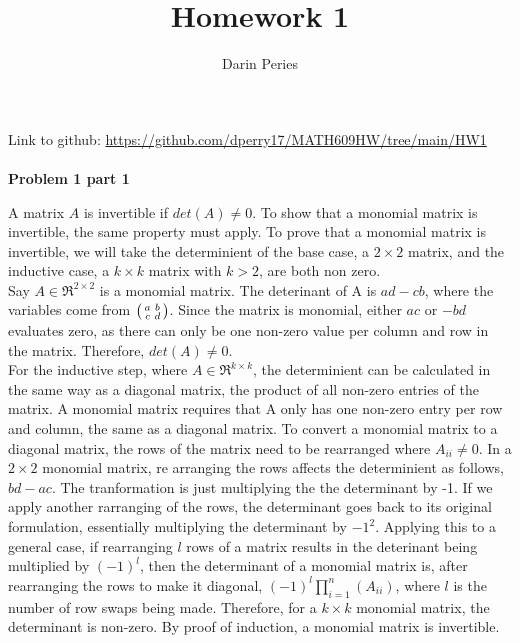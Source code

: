 \documentclass{report}
\title{Homework 1}
\author{Darin Peries}
\begin{document}
\maketitle

\noindent Link to github: \url{https://github.com/dperry17/MATH609HW/tree/main/HW1}\\\\

\noindent \textbf{Problem 1 part 1}

A matrix $A$ is invertible if $det(A) \neq 0$. To show that a monomial matrix is invertible, 
the same property must apply. To prove that a monomial matrix is invertible, we will take the 
determinient of the base case, a $2 \times 2$ matrix, and the inductive case, a $k \times k$ matrix with $k > 2$, are both 
non zero. \\

Say $A \in \Re^{2 \times 2}$ is a monomial matrix. The deterinant of A is $ad - cb$, where 
the variables come from $\begin{psmallmatrix}  a & b \\ c & d  \end{psmallmatrix}$. Since the
matrix is monomial, either $ac$ or $-bd$ evaluates zero, as there can only be one non-zero value 
per column and row in the matrix. Therefore, $det(A) \ne 0$. \\

For the inductive step, where $A \in \Re^{k \times k}$, the determinient can be calculated in the same way as a diagonal matrix, the product of all non-zero entries of the matrix.
A monomial matrix requires that A only has one non-zero entry per row and column, the same as a diagonal matrix. To convert a monomial matrix to
a diagonal matrix, the rows of the matrix need to be rearranged where $A_{ii} \neq 0$. In a $2 \times 2$ monomial matrix, re arranging the rows affects the determinient
as follows, $bd - ac$. The tranformation is just multiplying the the determinant by -1. If we apply another rarranging of the rows, the determinant
goes back to its original formulation, essentially multiplying the determinant by $-1^2$. Applying this to a general case, if rearranging $l$ rows of a matrix results in
the deterinant being multiplied by $(-1)^l$, then the determinant of a monomial matrix is, after rearranging the rows to make it diagonal, $(-1)^l \prod\limits_{i=1}^{n} (A_{ii})$,
where $l$ is the number of row swaps being made. Therefore, for a $k \times k$ monomial matrix, the determinant is non-zero. By proof of induction, a monomial matrix is invertible. \\\\
\end{document}
